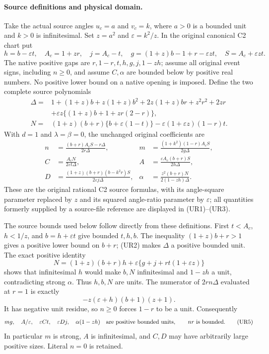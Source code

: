 \paragraph{Source definitions and physical domain.}
Take the actual source angles $u_c=a$ and $v_c=k$, where $a>0$ is a
bounded unit and $k>0$ is infinitesimal. Set $z=a^2$ and
$\varepsilon=k^2/z$. In the original canonical C2 chart put
\[
 h=b-\varepsilon t,\quad A_c=1+zr,\quad j=A_c-t,\quad
 g=(1+z)b-1+r-\varepsilon zt,\quad S=A_c+\varepsilon zt.
 \tag{UR1}\label{pc3daa35e9a9b:eq:ui-source-gaps}
\]
The native positive gaps are $r,1-r,t,h,g,j,1-zh$; assume all original
event signs, including $n\ge0$, and assume $C,\alpha$ are bounded below
by positive real numbers. No positive lower bound on a native opening
is imposed. Define the two complete source polynomials
\begin{align*}
 \Delta={}&1+(1+z)b+z(1+z)b^2+2z(1+z)br+z^2r^2+2zr\\
 &+\varepsilon z\{(1+z)b+1+zr(2-r)\},\\
 N={}&(1+z)(b+r)\{b+\varepsilon(1-t)\}
          -\varepsilon(1+\varepsilon z)(1-r)t.
 \tag{UR2}\label{pc3daa35e9a9b:eq:ui-source-polynomials}
\end{align*}
With $d=1$ and $\lambda=\beta=0$, the unchanged original coefficients
are
\[
 \begin{aligned}
 n&=\frac{(b+r)A_cS-r\Delta}{2r\Delta},&
 m&=\frac{(1+k^2)(1-r)A_cS}{2g\Delta},\\
 C&=\frac{A_cN}{2\varepsilon t\Delta},&
 A&=\frac{\varepsilon A_c(b+r)S}{2h\Delta},\\
 D&=\frac{(1+z)(b+r)(b-k^2r)S}{2\varepsilon j\Delta},&
 \alpha&=\frac{z^2(b+r)N}{2(1-zh)\Delta}.
 \end{aligned}                                                   \tag{UR3}
 \label{pc3daa35e9a9b:eq:ui-original-source}
\]
These are the original rational C2 source formulas, with its angle-square
parameter replaced by $z$ and its squared angle-ratio parameter by
$\varepsilon$; all quantities formerly supplied by a source-file
reference are displayed in (UR1)--(UR3).

The source bounds used below follow directly from these definitions.
First $t<A_c$, $h<1/z$, and $b=h+\varepsilon t$ give bounded $t,h,b$.
The inequality $(1+z)b+r>1$ gives a positive lower bound on $b+r$;
(UR2) makes $\Delta$ a positive bounded unit. The exact positive identity
\[
 N=(1+z)(b+r)h+
       \varepsilon\{g+j+rt(1+\varepsilon z)\}                 \tag{UR4}
\]
shows that infinitesimal $h$ would make $b,N$ infinitesimal and
$1-zh$ a unit, contradicting strong $\alpha$. Thus $h,b,N$ are units.
The numerator of $2rn\Delta$ evaluated at $r=1$ is exactly
\[
 -z(\varepsilon+h)(b+1)(z+1).
\]
It has negative unit residue, so $n\ge0$ forces $1-r$ to be a unit.
Consequently
\[
 mg,\quad A/\varepsilon,\quad \varepsilon Ct,\quad
 \varepsilon Dj,\quad \alpha(1-zh)
 \quad\hbox{are positive bounded units},\qquad nr\text{ is bounded}.
 \tag{UR5}\label{pc3daa35e9a9b:eq:ui-source-bounds}
\]
In particular $m$ is strong, $A$ is infinitesimal, and $C,D$ may have
arbitrarily large positive sizes. Literal $n=0$ is retained.

